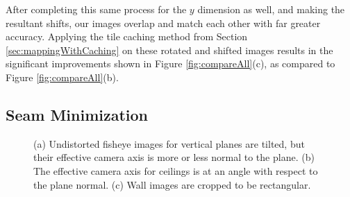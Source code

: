 \documentclass[10pt,twocolumn,letterpaper]{article}
\begin{document}
After completing this same process for the $y$ dimension as well, and
making the resultant shifts, our images overlap and match each other
with far greater accuracy. Applying the tile caching method from
Section \ref{sec:mappingWithCaching} on these rotated and shifted
images results in the significant improvements shown in Figure
\ref{fig:compareAll}(c), as compared to Figure
\ref{fig:compareAll}(b).


\subsection{Seam Minimization}
\label{sec:seamMinimization}

\begin{figure}
  \centering
  \centering
  \centering
  \caption{(a) Undistorted fisheye images for vertical planes are
    tilted, but their effective camera axis is more or less normal to
    the plane. (b) The effective camera axis for ceilings is at an
    angle with respect to the plane normal. (c) Wall images are
    cropped to be rectangular.}
  \label{fig:projectionAngles}
\end{figure}
\end{document}
